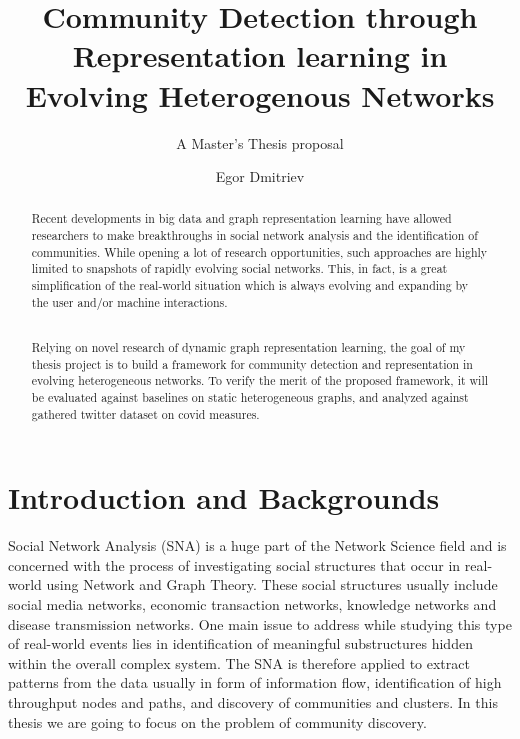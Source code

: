 \documentclass[
acmsmall,
nonacm,
screen,
acmthm]{../../scripts/pandoc/templates/acmart}
\title{Community Detection through Representation learning in Evolving
Heterogenous Networks}
\subtitle{A Master's Thesis proposal}
\author{Egor Dmitriev}
\affiliation{%
  \institution{Utrecht University}
  \country{The Netherlands}
}
\date{}
\begin{document}
\begin{abstract}
Recent developments in big data and graph representation learning have
allowed researchers to make breakthroughs in social network analysis and
the identification of communities. While opening a lot of research
opportunities, such approaches are highly limited to snapshots of
rapidly evolving social networks. This, in fact, is a great
simplification of the real-world situation which is always evolving and
expanding by the user and/or machine interactions.\\
\strut \\
Relying on novel research of dynamic graph representation learning, the
goal of my thesis project is to build a framework for community
detection and representation in evolving heterogeneous networks. To
verify the merit of the proposed framework, it will be evaluated against
baselines on static heterogeneous graphs, and analyzed against gathered
twitter dataset on covid measures.
\end{abstract}
\maketitle



{
\setcounter{tocdepth}{2}
\tableofcontents
\pagebreak
}





\hypertarget{introduction-and-backgrounds}{%
\section{Introduction and
Backgrounds}\label{introduction-and-backgrounds}}

Social Network Analysis (SNA) is a huge part of the Network Science
field and is concerned with the process of investigating social
structures that occur in real-world using Network and Graph Theory.
These social structures usually include social media networks, economic
transaction networks, knowledge networks and disease transmission
networks. One main issue to address while studying this type of
real-world events lies in identification of meaningful substructures
hidden within the overall complex system. The SNA is therefore applied
to extract patterns from the data usually in form of information flow,
identification of high throughput nodes and paths, and discovery of
communities and clusters. In this thesis we are going to focus on the
problem of community discovery.
\end{document}

